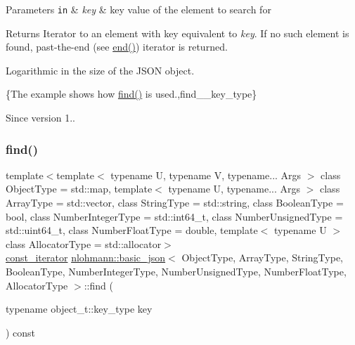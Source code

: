 \begin{DoxyParams}[1]{Parameters}
\mbox{\tt in}  & {\em key} & key value of the element to search for\\
\hline
\end{DoxyParams}
\begin{DoxyReturn}{Returns}
Iterator to an element with key equivalent to {\itshape key}. If no such element is found, past-\/the-\/end (see \hyperlink{classnlohmann_1_1basic__json_a12ccf14d39ddae52f6c7e126105a230b}{end()}) iterator is returned.
\end{DoxyReturn}
Logarithmic in the size of the J\+S\+ON object.

\{The example shows how {\ttfamily \hyperlink{classnlohmann_1_1basic__json_affe7e160e7bb06eed83c8b437af4692f}{find()}} is used.,find\+\_\+\+\_\+key\+\_\+type\}

\begin{DoxySince}{Since}
version 1.. 
\end{DoxySince}
\hypertarget{classnlohmann_1_1basic__json_a41aa8439842493e0595928a3e2cb7106}{}\label{classnlohmann_1_1basic__json_a41aa8439842493e0595928a3e2cb7106} 
\subsubsection{\texorpdfstring{find()}{find()}\hspace{0.1cm}{\footnotesize\ttfamily [2/2]}}
{\footnotesize\ttfamily template$<$template$<$ typename U, typename V, typename... Args $>$ class Object\+Type = std\+::map, template$<$ typename U, typename... Args $>$ class Array\+Type = std\+::vector, class String\+Type  = std\+::string, class Boolean\+Type  = bool, class Number\+Integer\+Type  = std\+::int64\+\_\+t, class Number\+Unsigned\+Type  = std\+::uint64\+\_\+t, class Number\+Float\+Type  = double, template$<$ typename U $>$ class Allocator\+Type = std\+::allocator$>$ \\
\hyperlink{classnlohmann_1_1basic__json_1_1const__iterator}{const\+\_\+iterator} \hyperlink{classnlohmann_1_1basic__json}{nlohmann\+::basic\+\_\+json}$<$ Object\+Type, Array\+Type, String\+Type, Boolean\+Type, Number\+Integer\+Type, Number\+Unsigned\+Type, Number\+Float\+Type, Allocator\+Type $>$\+::find (\begin{DoxyParamCaption}\item[{typename object\+\_\+t\+::key\+\_\+type}]{key }\end{DoxyParamCaption}) const\hspace{0.3cm}{\ttfamily [inline]}}



